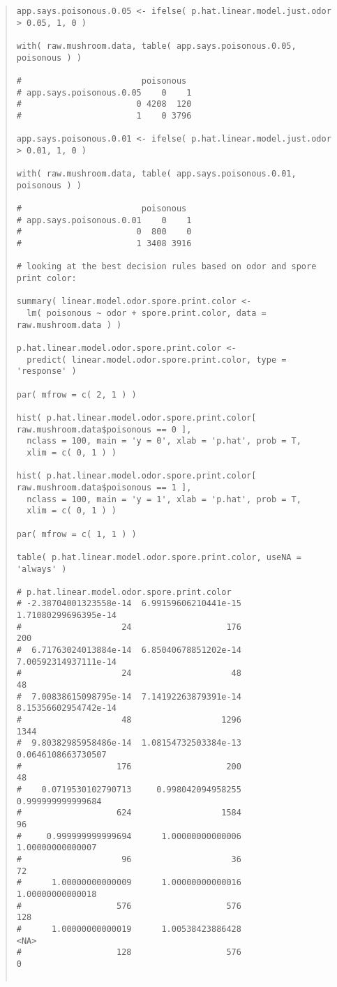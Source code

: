 \documentclass[12pt]{article}
\begin{document}
\begin{quote}
\begin{verbatim}
app.says.poisonous.0.05 <- ifelse( p.hat.linear.model.just.odor > 0.05, 1, 0 )

with( raw.mushroom.data, table( app.says.poisonous.0.05, poisonous ) )

#                        poisonous
# app.says.poisonous.0.05    0    1
#                       0 4208  120
#                       1    0 3796

app.says.poisonous.0.01 <- ifelse( p.hat.linear.model.just.odor > 0.01, 1, 0 )

with( raw.mushroom.data, table( app.says.poisonous.0.01, poisonous ) )

#                        poisonous
# app.says.poisonous.0.01    0    1
#                       0  800    0
#                       1 3408 3916

# looking at the best decision rules based on odor and spore print color:

summary( linear.model.odor.spore.print.color <- 
  lm( poisonous ~ odor + spore.print.color, data = raw.mushroom.data ) )

p.hat.linear.model.odor.spore.print.color <- 
  predict( linear.model.odor.spore.print.color, type = 'response' )

par( mfrow = c( 2, 1 ) )

hist( p.hat.linear.model.odor.spore.print.color[ raw.mushroom.data$poisonous == 0 ],
  nclass = 100, main = 'y = 0', xlab = 'p.hat', prob = T,
  xlim = c( 0, 1 ) )

hist( p.hat.linear.model.odor.spore.print.color[ raw.mushroom.data$poisonous == 1 ],
  nclass = 100, main = 'y = 1', xlab = 'p.hat', prob = T,
  xlim = c( 0, 1 ) )

par( mfrow = c( 1, 1 ) )

table( p.hat.linear.model.odor.spore.print.color, useNA = 'always' )

# p.hat.linear.model.odor.spore.print.color
# -2.38704001323558e-14  6.99159606210441e-15  1.71080299696395e-14 
#                    24                   176                   200 
#  6.71763024013884e-14  6.85040678851202e-14  7.00592314937111e-14 
#                    24                    48                    48 
#  7.00838615098795e-14  7.14192263879391e-14  8.15356602954742e-14 
#                    48                  1296                  1344 
#  9.80382985958486e-14  1.08154732503384e-13    0.0646108663730507 
#                   176                   200                    48 
#    0.0719530102790713     0.998042094958255     0.999999999999684 
#                   624                  1584                    96 
#     0.999999999999694      1.00000000000006      1.00000000000007 
#                    96                    36                    72 
#      1.00000000000009      1.00000000000016      1.00000000000018 
#                   576                   576                   128 
#      1.00000000000019      1.00538423886428                  <NA> 
#                   128                   576                     0


\end{verbatim}
\end{quote}
\end{document}
